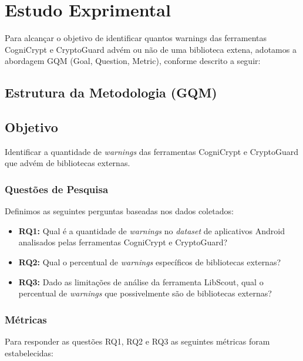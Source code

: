 \section{Estudo Exprimental}

Para alcançar o objetivo de identificar quantos warnings das ferramentas CogniCrypt e CryptoGuard advém ou não de uma biblioteca extena, adotamos a abordagem GQM (Goal, Question, Metric), conforme descrito a seguir:

\subsection{Estrutura da Metodologia (GQM)}

\subsection{Objetivo}

Identificar a quantidade de \textit{warnings} das ferramentas CogniCrypt e CryptoGuard que advém de bibliotecas externas. 

\subsubsection{Questões de Pesquisa}
Definimos as seguintes perguntas baseadas nos dados coletados:

\begin{itemize}
\item \textbf{RQ1:} Qual é a quantidade de \textit{warnings} no \textit{dataset} de aplicativos Android analisados pelas ferramentas CogniCrypt e CryptoGuard?

\item \textbf{RQ2:} Qual o percentual de \textit{warnings} específicos de bibliotecas externas?

\item \textbf{RQ3:} Dado as limitações de análise da ferramenta LibScout, qual o percentual de \textit{warnings} que possivelmente são de bibliotecas externas?

\end{itemize}

\subsubsection{Métricas}
Para responder as questões RQ1, RQ2 e RQ3 as seguintes métricas foram estabelecidas:


